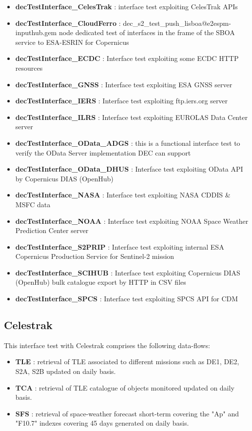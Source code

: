 \documentclass[dec_sum_main.tex]{subfiles}
\begin{document}
\begin{itemize}
    \item \textbf{decTestInterface\_CelesTrak} : interface test exploiting CelesTrak APIs
     \item \textbf{decTestInterface\_CloudFerro} : dec\_s2\_test\_push\_lisboa@e2espm-inputhub.gem node dedicated test of interfaces in the frame of the SBOA service to ESA-ESRIN for Copernicus
     \item \textbf{decTestInterface\_ECDC} : Interface test exploiting some ECDC HTTP resources
     \item \textbf{decTestInterface\_GNSS} : Interface test exploiting ESA GNSS server
     \item \textbf{decTestInterface\_IERS} : Interface test exploiting ftp.iers.org  server
     \item \textbf{decTestInterface\_ILRS} : Interface test exploiting EUROLAS Data Center server
     \item \textbf{decTestInterface\_OData\_ADGS} : this is a functional interface test to verify the OData Server implementation DEC can support
     \item \textbf{decTestInterface\_OData\_DHUS} : Interface test exploiting OData API by Copernicus DIAS (OpenHub)
     \item \textbf{decTestInterface\_NASA} : Interface test exploiting NASA CDDIS \& MSFC data
     \item \textbf{decTestInterface\_NOAA} : Interface test exploiting NOAA Space Weather Prediction Center server
     \item \textbf{decTestInterface\_S2PRIP} : Interface test exploiting internal ESA Copernicus Production Service for Sentinel-2 mission
     \item \textbf{decTestInterface\_SCIHUB} : Interface test exploiting Copernicus DIAS (OpenHub) bulk catalogue export by HTTP in CSV files
     \item \textbf{decTestInterface\_SPCS} : Interface test exploiting SPCS API for CDM     
\end{itemize}

\subsection{Celestrak}
This interface test with Celestrak comprises the following data-flows:
\begin{itemize}
    \item \textbf{TLE} : retrieval of TLE associated to different missions such as DE1, DE2, S2A, S2B updated on daily basis.
    \item \textbf{TCA} : retrieval of TLE catalogue of objects monitored updated on daily basis.
    \item \textbf{SFS} : retrieval of space-weather forecast short-term covering the "Ap" and "F10.7" indexes covering 45 days generated on daily basis.
\end{itemize}
\end{document}
